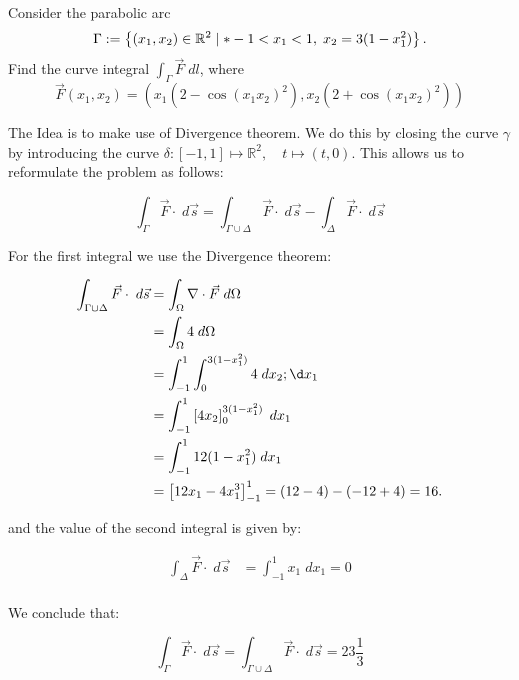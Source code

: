 \documentclass[11pt]{article}
\begin{document}
\begin{exercise}
    Consider the parabolic arc 
    \[
        \Gamma := \left\{ (x_1,x_2) \in \bbR^{2} \suchthat* -1 < x_1 < 1, \; x_2 = 3 ( 1 - x_1^2 ) \right\}.
    \]
    Find the curve integral $\int_\Gamma \vec F \;dl$, where 
    \[
        \vec F(x_1,x_2) = \left( x_1 ( 2 - \cos(x_1x_2)^{2} ), x_2 ( 2 + \cos(x_1x_2)^{2} ) \right)
    \]
\end{exercise}
\begin{solution}

The Idea is to make use of Divergence theorem. We do this by closing the curve $\gamma$ by introducing the curve $\delta: [-1,1] \mapsto \mathbb{R}^2, \quad t\mapsto  (t,0)$. This allows us to reformulate the problem as follows:

$$
\int_{\Gamma} \vec{F} \cdot \; d\vec{s} = \int_{\Gamma\cup \Delta} \vec{F} \cdot 
\; d\vec{s}-\int_{\Delta} \vec{F}\cdot \;d \vec{s}
$$

For the first integral we use the Divergence theorem:

\begin{align*}
    \int_{\Gamma\cup\Delta} \vec{F} \cdot 
    \; d\vec{s} &= \int_{\Omega} \nabla\cdot\vec{F}\;d \Omega\\
    &=\int_{\Omega} 4\;d \Omega\\
    &=\int_{-1}^1\int_{0}^{3(1-x_1^2)} 4 \;d x_2 ;\d x_1\\
    &=\int_{-1}^1\left[4x_2\right]_{0}^{3(1-x_1^2)}  \;d x_1\\
    &=\int_{-1}^1 12( 1-x_1^2)\;d x_1
    \\
    &=
    \left[ 12 x_1 - 4 x_1^3 \right]_{-1}^1
    =
    ( 12 - 4 ) - ( -12 + 4 )
    = 
    16.
\end{align*}

and the value of the second integral is given by:

\begin{align*}
\int_{\Delta} \vec{F} \cdot 
\; d\vec{s} &= \int_{-1}^1 x_1 
\; dx_1 =0\\
\end{align*}

We conclude that:

$$
\int_{\Gamma} \vec{F} \cdot \; d\vec{s} = \int_{\Gamma\cup \Delta} \vec{F} \cdot 
\; d\vec{s} = 23\frac{1}{3}
$$

\end{solution}
\end{document}
